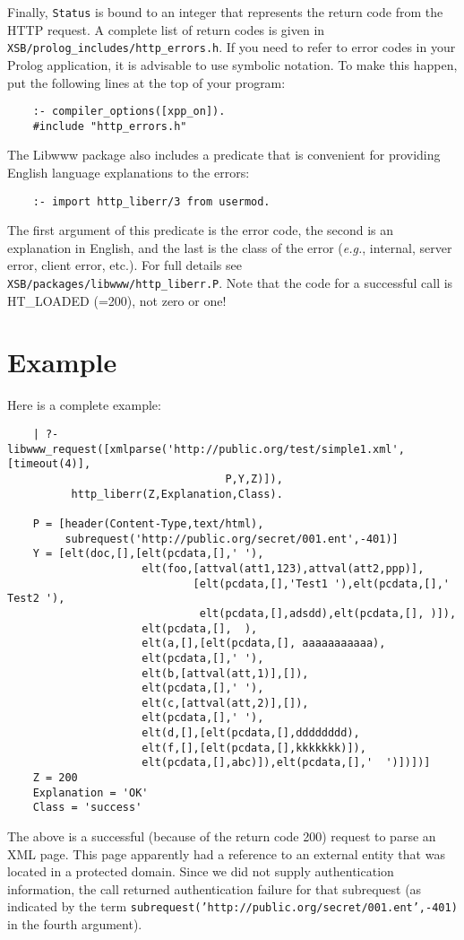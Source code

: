 Finally, {\tt Status} is bound to an integer that represents the return
code from the HTTP request. A complete list of return codes is given in
{\tt XSB/prolog\_includes/http\_errors.h}. If you need to refer to error
codes in your Prolog application, it is advisable to use symbolic
notation. To make this happen, put the following lines at the top of your
program: 
\begin{verbatim}
    :- compiler_options([xpp_on]).
    #include "http_errors.h"
\end{verbatim}
The Libwww package also includes a predicate that is convenient for
providing English language explanations to the errors:
\begin{verbatim}
    :- import http_liberr/3 from usermod.  
\end{verbatim}
The first argument of this predicate is the error code, the second is an
explanation in English, and the last is the class of the error ({\it e.g.},
internal, server error, client error, etc.). For full details see
{\tt XSB/packages/libwww/http\_liberr.P}. Note that the code for a successful 
call is HT\_LOADED (=200), not zero or one!

\section{Example}

Here is a complete example:
\begin{verbatim}
    | ?- libwww_request([xmlparse('http://public.org/test/simple1.xml',[timeout(4)],
                                  P,Y,Z)]),
          http_liberr(Z,Explanation,Class).

    P = [header(Content-Type,text/html),
         subrequest('http://public.org/secret/001.ent',-401)]
    Y = [elt(doc,[],[elt(pcdata,[],' '),
                     elt(foo,[attval(att1,123),attval(att2,ppp)],
                             [elt(pcdata,[],'Test1 '),elt(pcdata,[],' Test2 '),
                              elt(pcdata,[],adsdd),elt(pcdata,[], )]),
                     elt(pcdata,[],  ),
                     elt(a,[],[elt(pcdata,[], aaaaaaaaaaa),
                     elt(pcdata,[],' '),
                     elt(b,[attval(att,1)],[]),
                     elt(pcdata,[],' '),
                     elt(c,[attval(att,2)],[]),
                     elt(pcdata,[],' '),
                     elt(d,[],[elt(pcdata,[],dddddddd),
                     elt(f,[],[elt(pcdata,[],kkkkkkk)]),
                     elt(pcdata,[],abc)]),elt(pcdata,[],'  ')])])]
    Z = 200
    Explanation = 'OK'
    Class = 'success'
\end{verbatim}
The above is a successful (because of the return code 200) request to parse
an XML page. This page apparently had a reference to an external entity
that was located in a protected domain. Since we did not supply
authentication information, the call returned authentication failure for
that subrequest (as indicated by the term 
{\tt subrequest('http://public.org/secret/001.ent',-401)} in the fourth
argument).




